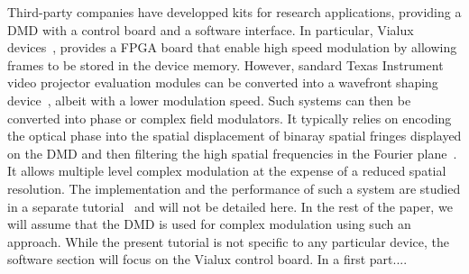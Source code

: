 \documentclass[12pt]{iopart}
\begin{document}
Third-party companies have developped kits for research applications,
providing a DMD with a control board and a software interface. 
In particular, Vialux devices~\cite{}, provides a FPGA board that enable high speed modulation 
by allowing frames to be stored in the device memory. 
However, sandard Texas Instrument video projector evaluation modules can be converted into a wavefront shaping device~\cite{Cox2021converting}, 
albeit with a lower modulation speed.
Such systems can then be converted into phase or complex field modulators. 
It typically relies on encoding the optical phase into 
the spatial displacement of binaray spatial fringes displayed on the DMD 
and then filtering the high spatial frequencies in the Fourier plane~\cite{Lee1979binary}.
It allows multiple level complex modulation at the expense of a reduced spatial resolution.
The implementation and the performance of such a system are studied in a separate tutorial~\cite{RODRIGO} 
and will not be detailed here.
In the rest of the paper, we will assume that the DMD is used for complex modulation using such an approach.
While the present tutorial is not specific to any particular device, 
the software section will focus on the Vialux control board.
In a first part....\\
\end{document}
